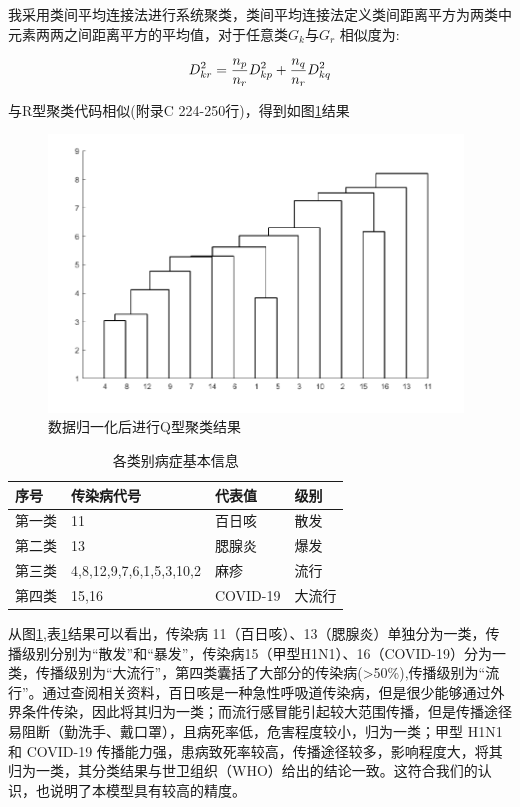 \documentclass[a4paper, 11pt,twoside=true,UTF8]{scrartcl}
\begin{document}
我采用类间平均连接法进行系统聚类，类间平均连接法定义类间距离平方为两类中元素两两之间距离平方的平均值，对于任意类$G_k$与$G_r$ 相似度为:

$$
\begin{aligned}
\centering
D_{kr}^2=\frac{n_p}{n_r}D_{kp}^2+\frac{n_q}{n_r}D_{kq}^2
\end{aligned}
$$

与R型聚类代码相似(附录C 224-250行)，得到如图\ref{sp1}结果
\begin{figure}[h]
	\small
	\centering
	\includegraphics[width=11cm]{sp1}
	\caption{数据归一化后进行Q型聚类结果} \label{sp1}
\end{figure}
\begin{table}[H]
	\centering
	\caption{各类别病症基本信息} \label{P3T4}
	\begin{tabular}{llll}
		\hline
		\textbf{序号} & \textbf{传染病代号}          & \textbf{代表值} & \textbf{级别} \\ \hline
		第一类         & 11                      & 百日咳          & 散发          \\
		第二类         & 13                      & 腮腺炎          & 爆发          \\
		第三类         & 4,8,12,9,7,6,1,5,3,10,2 & 麻疹           & 流行          \\
		第四类         & 15,16                   & COVID-19     & 大流行         \\ \hline
	\end{tabular}
\end{table}
从图\ref{sp1},表\ref{P3T4}结果可以看出，传染病 11（百日咳）、13（腮腺炎）单独分为一类，传播级别分别为“散发”和“暴发”，传染病15（甲型H1N1）、16（COVID-19）分为一类，传播级别为“大流行”，第四类囊括了大部分的传染病(>50\%),传播级别为“流行”。通过查阅相关资料，百日咳是一种急性呼吸道传染病，但是很少能够通过外界条件传染，因此将其归为一类；而流行感冒能引起较大范围传播，但是传播途径易阻断（勤洗手、戴口罩），且病死率低，危害程度较小，归为一类；甲型 H1N1 和 COVID-19 传播能力强，患病致死率较高，传播途径较多，影响程度大，将其归为一类，其分类结果与世卫组织（WHO）给出的结论一致。这符合我们的认识，也说明了本模型具有较高的精度。 
\end{document}
